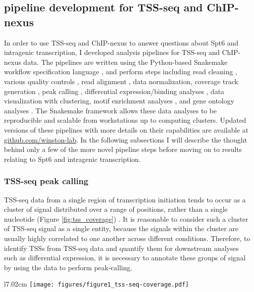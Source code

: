 \documentclass[9pt, letterpaper]{article}
\begin{document}
\subsection{pipeline development for TSS-seq and ChIP-nexus}

In order to use TSS-seq and ChIP-nexus to answer questions about Spt6 and intragenic transcription, I developed analysis pipelines for TSS-seq and ChIP-nexus data. The pipelines are written using the Python-based Snakemake workflow specification language \cite{koster2012}, and perform steps including read cleaning \cite{martin2011}, various quality controls \cite{andrews2012}, read alignment \cite{kim2013, langmead2012}, data normalization, coverage track generation \cite{quinlan2010}, peak calling \cite{zhang2008}, differential expression/binding analyses \cite{love2014}, data visualization with clustering, motif enrichment analyses \cite{bailey2015}, and gene ontology analyses \cite{young2010}. The Snakemake framework allows these data analyses to be reproducible and scalable from workstations up to computing clusters. Updated versions of these pipelines with more details on their capabilities are available at \href{https://github.com/winston-lab}{github.com/winston-lab}. In the following subsections I will describe the thought behind only a few of the more novel pipeline steps before moving on to results relating to Spt6 and intragenic transcription.

\subsubsection{TSS-seq peak calling}

TSS-seq data from a single region of transcription initiation tends to occur as a cluster of signal distributed over a range of positions, rather than a single nucleotide (Figure \ref{fig:tss_coverage}) \cite{arribere2013, malabat2015}. It is reasonable to consider such a cluster of TSS-seq signal as a single entity, because the signals within the cluster are usually highly correlated to one another across different conditions. Therefore, to identify TSSs from TSS-seq data and quantify them for downstream analyses such as differential expression, it is necessary to annotate these groups of signal by using the data to perform peak-calling.

\begin{wrapfigure}[12]{l}{7.02cm}
\centering
\texttt{[image: figures/figure1\_tss-seq-coverage.pdf]}
\caption{Wild-type sense strand TSS-seq signal at the \textit{TEF1} genic TSS. Normalized counts are the mean of spike-in normalized coverage from two replicates.}
\label{fig:tss_coverage}
\end{wrapfigure}
\end{document}
